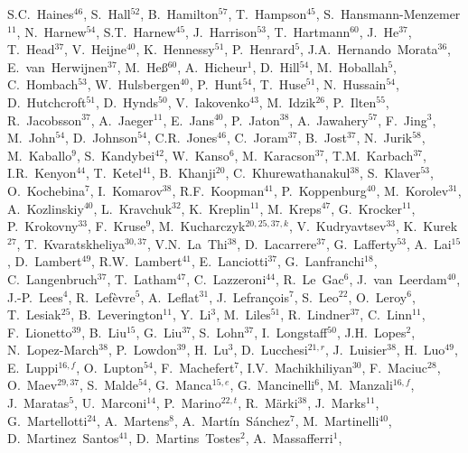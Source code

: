 \documentclass[12pt,a4paper]{article}
\begin{document}
\begin{flushleft}
S.C.~Haines$^{46}$, 
S.~Hall$^{52}$, 
B.~Hamilton$^{57}$, 
T.~Hampson$^{45}$, 
S.~Hansmann-Menzemer$^{11}$, 
N.~Harnew$^{54}$, 
S.T.~Harnew$^{45}$, 
J.~Harrison$^{53}$, 
T.~Hartmann$^{60}$, 
J.~He$^{37}$, 
T.~Head$^{37}$, 
V.~Heijne$^{40}$, 
K.~Hennessy$^{51}$, 
P.~Henrard$^{5}$, 
J.A.~Hernando~Morata$^{36}$, 
E.~van~Herwijnen$^{37}$, 
M.~He\ss$^{60}$, 
A.~Hicheur$^{1}$, 
D.~Hill$^{54}$, 
M.~Hoballah$^{5}$, 
C.~Hombach$^{53}$, 
W.~Hulsbergen$^{40}$, 
P.~Hunt$^{54}$, 
T.~Huse$^{51}$, 
N.~Hussain$^{54}$, 
D.~Hutchcroft$^{51}$, 
D.~Hynds$^{50}$, 
V.~Iakovenko$^{43}$, 
M.~Idzik$^{26}$, 
P.~Ilten$^{55}$, 
R.~Jacobsson$^{37}$, 
A.~Jaeger$^{11}$, 
E.~Jans$^{40}$, 
P.~Jaton$^{38}$, 
A.~Jawahery$^{57}$, 
F.~Jing$^{3}$, 
M.~John$^{54}$, 
D.~Johnson$^{54}$, 
C.R.~Jones$^{46}$, 
C.~Joram$^{37}$, 
B.~Jost$^{37}$, 
N.~Jurik$^{58}$, 
M.~Kaballo$^{9}$, 
S.~Kandybei$^{42}$, 
W.~Kanso$^{6}$, 
M.~Karacson$^{37}$, 
T.M.~Karbach$^{37}$, 
I.R.~Kenyon$^{44}$, 
T.~Ketel$^{41}$, 
B.~Khanji$^{20}$, 
C.~Khurewathanakul$^{38}$, 
S.~Klaver$^{53}$, 
O.~Kochebina$^{7}$, 
I.~Komarov$^{38}$, 
R.F.~Koopman$^{41}$, 
P.~Koppenburg$^{40}$, 
M.~Korolev$^{31}$, 
A.~Kozlinskiy$^{40}$, 
L.~Kravchuk$^{32}$, 
K.~Kreplin$^{11}$, 
M.~Kreps$^{47}$, 
G.~Krocker$^{11}$, 
P.~Krokovny$^{33}$, 
F.~Kruse$^{9}$, 
M.~Kucharczyk$^{20,25,37,k}$, 
V.~Kudryavtsev$^{33}$, 
K.~Kurek$^{27}$, 
T.~Kvaratskheliya$^{30,37}$, 
V.N.~La~Thi$^{38}$, 
D.~Lacarrere$^{37}$, 
G.~Lafferty$^{53}$, 
A.~Lai$^{15}$, 
D.~Lambert$^{49}$, 
R.W.~Lambert$^{41}$, 
E.~Lanciotti$^{37}$, 
G.~Lanfranchi$^{18}$, 
C.~Langenbruch$^{37}$, 
T.~Latham$^{47}$, 
C.~Lazzeroni$^{44}$, 
R.~Le~Gac$^{6}$, 
J.~van~Leerdam$^{40}$, 
J.-P.~Lees$^{4}$, 
R.~Lef\`{e}vre$^{5}$, 
A.~Leflat$^{31}$, 
J.~Lefran\c{c}ois$^{7}$, 
S.~Leo$^{22}$, 
O.~Leroy$^{6}$, 
T.~Lesiak$^{25}$, 
B.~Leverington$^{11}$, 
Y.~Li$^{3}$, 
M.~Liles$^{51}$, 
R.~Lindner$^{37}$, 
C.~Linn$^{11}$, 
F.~Lionetto$^{39}$, 
B.~Liu$^{15}$, 
G.~Liu$^{37}$, 
S.~Lohn$^{37}$, 
I.~Longstaff$^{50}$, 
J.H.~Lopes$^{2}$, 
N.~Lopez-March$^{38}$, 
P.~Lowdon$^{39}$, 
H.~Lu$^{3}$, 
D.~Lucchesi$^{21,r}$, 
J.~Luisier$^{38}$, 
H.~Luo$^{49}$, 
E.~Luppi$^{16,f}$, 
O.~Lupton$^{54}$, 
F.~Machefert$^{7}$, 
I.V.~Machikhiliyan$^{30}$, 
F.~Maciuc$^{28}$, 
O.~Maev$^{29,37}$, 
S.~Malde$^{54}$, 
G.~Manca$^{15,e}$, 
G.~Mancinelli$^{6}$, 
M.~Manzali$^{16,f}$, 
J.~Maratas$^{5}$, 
U.~Marconi$^{14}$, 
P.~Marino$^{22,t}$, 
R.~M\"{a}rki$^{38}$, 
J.~Marks$^{11}$, 
G.~Martellotti$^{24}$, 
A.~Martens$^{8}$, 
A.~Mart\'{i}n~S\'{a}nchez$^{7}$, 
M.~Martinelli$^{40}$, 
D.~Martinez~Santos$^{41}$, 
D.~Martins~Tostes$^{2}$, 
A.~Massafferri$^{1}$, 

\end{flushleft}
\end{document}
